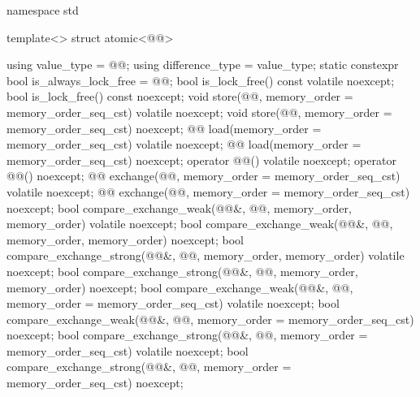 \begin{codeblock}
namespace std {
  template<> struct atomic<@@> {
    using value_type = @@;
    using difference_type = value_type;
    static constexpr bool is_always_lock_free = @@;
    bool is_lock_free() const volatile noexcept;
    bool is_lock_free() const noexcept;
    void store(@@, memory_order = memory_order_seq_cst) volatile noexcept;
    void store(@@, memory_order = memory_order_seq_cst) noexcept;
    @@ load(memory_order = memory_order_seq_cst) volatile noexcept;
    @@ load(memory_order = memory_order_seq_cst) noexcept;
    operator @@() volatile noexcept;
    operator @@() noexcept;
    @@ exchange(@@,
                            memory_order = memory_order_seq_cst) volatile noexcept;
    @@ exchange(@@,
                            memory_order = memory_order_seq_cst) noexcept;
    bool compare_exchange_weak(@@&, @@,
                               memory_order, memory_order) volatile noexcept;
    bool compare_exchange_weak(@@&, @@,
                               memory_order, memory_order) noexcept;
    bool compare_exchange_strong(@@&, @@,
                                 memory_order, memory_order) volatile noexcept;
    bool compare_exchange_strong(@@&, @@,
                                 memory_order, memory_order) noexcept;
    bool compare_exchange_weak(@@&, @@,
                               memory_order = memory_order_seq_cst) volatile noexcept;
    bool compare_exchange_weak(@@&, @@,
                               memory_order = memory_order_seq_cst) noexcept;
    bool compare_exchange_strong(@@&, @@,
                                 memory_order = memory_order_seq_cst) volatile noexcept;
    bool compare_exchange_strong(@@&, @@,
                                 memory_order = memory_order_seq_cst) noexcept;

}}
\end{codeblock}
